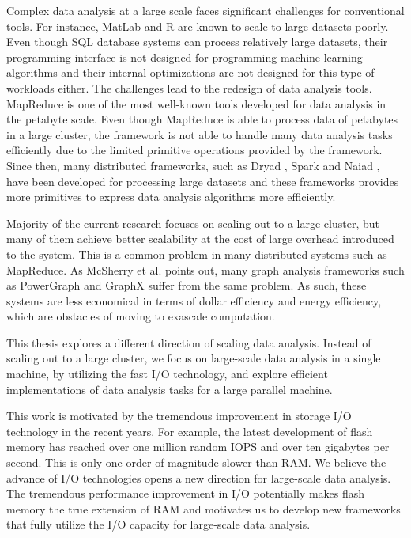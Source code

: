 Complex data analysis at a large scale faces significant challenges for
conventional tools. For instance, MatLab and R are known to scale to large
datasets poorly. Even though SQL database systems can process relatively large
datasets, their programming interface is not designed for programming machine
learning algorithms and their internal optimizations are not designed for this
type of workloads either.
The challenges lead to the redesign of data analysis tools.
MapReduce \cite{mapreduce} is one of the most well-known tools developed for
data analysis in the petabyte scale. Even though MapReduce is able to
process data of petabytes in a large cluster, the framework is not able to
handle many data analysis tasks efficiently due to the limited primitive
operations provided by the framework. Since then, many distributed frameworks,
such as Dryad \cite{dryad}, Spark \cite{spark} and Naiad \cite{naiad}, have
been developed for processing large datasets and these frameworks provides
more primitives to express data analysis algorithms more efficiently.

Majority of the current research focuses on scaling out to a large cluster,
but many of them achieve better scalability at the cost of large overhead
introduced to the system. This is a common problem in many distributed systems
such as MapReduce. As McSherry et al. \cite{mcsherry15}
points out, many graph analysis frameworks such as PowerGraph \cite{powergraph}
and GraphX \cite{graphx} suffer from the same problem. As such, these systems
are less economical in terms of dollar efficiency and energy efficiency, which
are obstacles of moving to exascale computation.

This thesis explores a different direction of scaling data analysis. Instead
of scaling out to a large cluster, we focus on large-scale data analysis in
a single machine, by utilizing the fast I/O technology, and explore
efficient implementations of data analysis tasks for a large parallel machine.

This work is motivated
by the tremendous improvement in storage I/O technology in the recent years.
For example, the latest development of flash memory \cite{fusionio, safs} has
reached over one million random IOPS and over ten gigabytes per second. This
is only one order of magnitude slower than RAM. We believe the advance of
I/O technologies opens a new direction for large-scale data analysis.
The tremendous performance
improvement in I/O potentially makes flash memory the true extension of RAM
and motivates us to develop new frameworks that fully utilize the I/O capacity
for large-scale data analysis.

